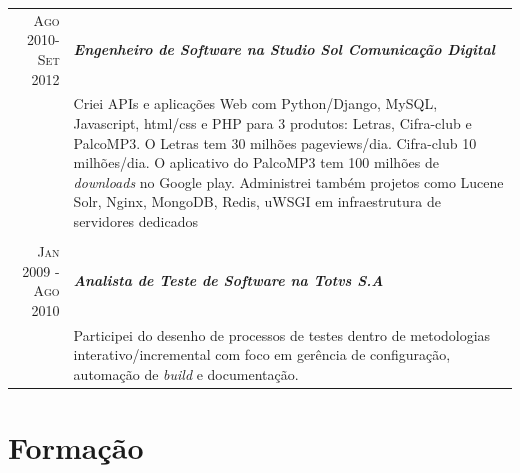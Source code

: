 \documentclass[a4paper,10pt]{article} %
\begin{document}
\begin{longtable}{r|p{11cm}}

\textsc{Ago 2010-Set 2012} & \emph{\bf Engenheiro de Software na
Studio Sol Comunicação Digital}  \\
& \footnotesize{Criei APIs e aplicações Web com Python/Django, MySQL,
    Javascript, html/css e PHP para 3 produtos: Letras, Cifra-club e PalcoMP3.
    O Letras tem 30 milhões pageviews/dia. Cifra-club 10 milhões/dia. O
    aplicativo do PalcoMP3 tem 100 milhões de \emph{downloads} no Google play.
    Administrei também projetos como Lucene Solr, Nginx, MongoDB, Redis, uWSGI
    em infraestrutura de servidores dedicados
}\\
\multicolumn{2}{c}{} \\


\textsc{Jan 2009 - Ago 2010} & \emph{\bf Analista de Teste de Software
na Totvs S.A} \\
& \footnotesize{Participei do desenho de processos de testes dentro de
metodologias interativo/incremental com foco em gerência de configuração,
automação de \emph{build} e documentação.}

\end{longtable}




\section{Formação}
\end{document}
